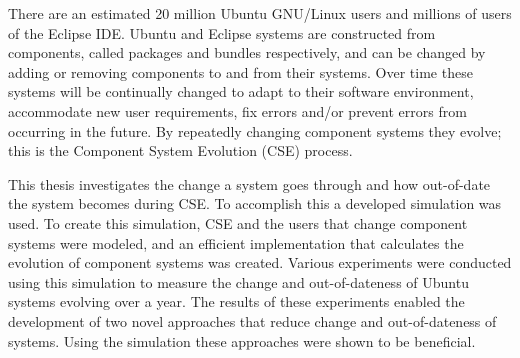 There are an estimated 20 million Ubuntu GNU/Linux users and millions of users of the Eclipse IDE.
Ubuntu and Eclipse systems are constructed from components, called packages and bundles respectively, 
and can be changed by adding or removing components to and from their systems. 
Over time these systems will be continually changed to adapt to their software environment, accommodate new user requirements, 
fix errors and/or prevent errors from occurring in the future.
By repeatedly changing component systems they evolve; this is the Component System Evolution (CSE) process.

This thesis investigates the change a system goes through and  how out-of-date the system becomes during CSE.
To accomplish this a developed simulation was used.
To create this simulation, CSE and the users that change component systems were modeled, 
and an efficient implementation that calculates the evolution of component systems was created.
Various experiments were conducted using this simulation to measure the change and out-of-dateness of Ubuntu systems evolving over a year. 
The results of these experiments enabled the development of two novel approaches that reduce change and out-of-dateness of systems.
Using the simulation these approaches were shown to be beneficial.

